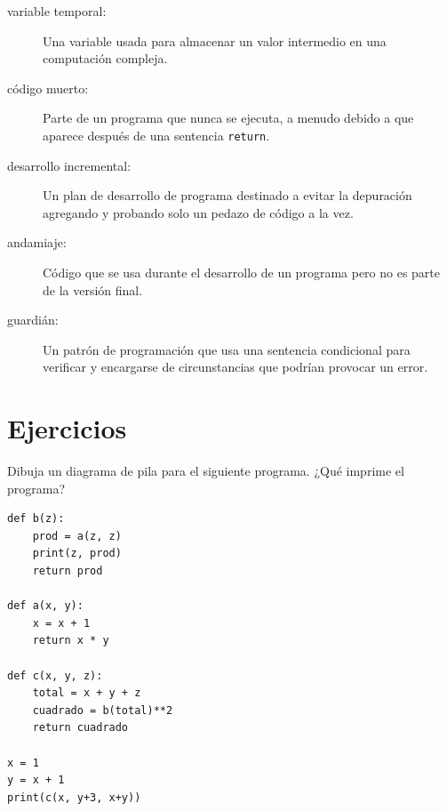 \documentclass[10pt]{book}
\begin{document}
\begin{description}

\item[variable temporal:]  Una variable usada para almacenar un valor intermedio en
una computación compleja.

\item[código muerto:]  Parte de un programa que nunca se ejecuta, a menudo debido a que
aparece después de una sentencia {\tt return}.

\item[desarrollo incremental:]  Un plan de desarrollo de programa destinado a
evitar la depuración agregando y probando solo
un pedazo de código a la vez.

\item[andamiaje:]  Código que se usa durante el desarrollo de un programa pero
no es parte de la versión final.

\item[guardián:]  Un patrón de programación que usa una sentencia
condicional para verificar y encargarse de circunstancias que
podrían provocar un error.

\end{description}


\section{Ejercicios}

\begin{exercise}

Dibuja un diagrama de pila para el siguiente programa.  ¿Qué imprime el programa?

\begin{verbatim}
def b(z):
    prod = a(z, z)
    print(z, prod)
    return prod

def a(x, y):
    x = x + 1
    return x * y

def c(x, y, z):
    total = x + y + z
    cuadrado = b(total)**2
    return cuadrado

x = 1
y = x + 1
print(c(x, y+3, x+y))
\end{verbatim}

\end{exercise}
\end{document}
